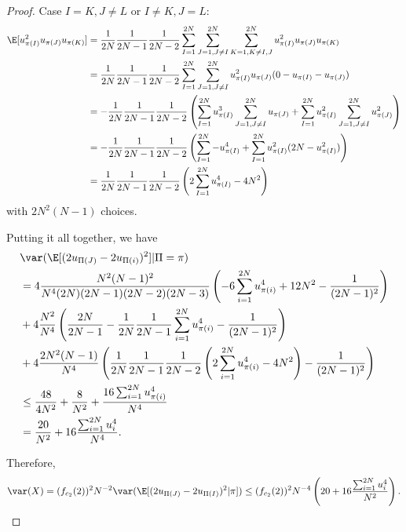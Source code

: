 \begin{proof}
  Case $I=K, J\neq L$ or $I\neq K, J= L$:
  \begin{align*}
    \E[u_{\pi(I)}^2 u_{\pi(J)} u_{\pi(K)}] &= \frac{1}{2N}\frac{1}{2N-1}\frac{1}{2N-2} \sum_{I=1}^{2N}
    \sum_{J=1, J\neq I}^{2N} \sum_{K=1, K \neq I,J}^{2N} u_{\pi(I)}^2 u_{\pi(J)} u_{\pi(K)} \\
    &=\frac{1}{2N}\frac{1}{2N-1}\frac{1}{2N-2} \sum_{I=1}^{2N}
    \sum_{J=1, J\neq I}^{2N} u_{\pi(I)}^2 u_{\pi(J)} (0 - u_{\pi(I)} - u_{\pi(J)}) \\ 
    &=-\frac{1}{2N}\frac{1}{2N-1}\frac{1}{2N-2} \left(
      \sum_{I=1}^{2N} u_{\pi(I)}^3 \sum_{J=1, J\neq I}^{2N} u_{\pi(J)} +
      \sum_{I=1}^{2N} u_{\pi(I)}^2 \sum_{J=1, J\neq I}^{2N} u_{\pi(J)}^2
    \right ) \\
    &=-\frac{1}{2N}\frac{1}{2N-1}\frac{1}{2N-2} \left(
      \sum_{I=1}^{2N} - u_{\pi(I)}^4 + 
      \sum_{I=1}^{2N} u_{\pi(I)}^2 (2N - u_{\pi(I)}^2)
    \right ) \\
    &=\frac{1}{2N}\frac{1}{2N-1}\frac{1}{2N-2} \left(
      2 \sum_{I=1}^{2N} u_{\pi(I)}^4 -4N^2 \right )
  \end{align*}
  with $2N^2(N-1)$ choices.  

  Putting it all together, we have 
  \begin{align*}
    &\var (\E[(2u_{\Pi(J)}-2u_{\Pi(i)})^2] | \Pi = \pi) \\
    &= 4 \frac{N^2(N-1)^2}{N^4(2N)(2N-1)(2N-2)(2N-3)} \left ( -6
      \sum_{i=1}^{2N}u_{\pi(i)}^4 + 12N^2 - \frac{1}{(2N-1)^2} \right ) \\
    &+ 4 \frac{N^2}{N^4} \left ( \frac{2N}{2N-1} -
    \frac{1}{2N}\frac{1}{2N-1}\sum_{i=1}^{2N}u_{\pi(i)}^4 - \frac{1}{(2N-1)^2}
  \right ) \\
  &+ 4 \frac{2N^2(N-1)}{N^4} \left ( 
    \frac{1}{2N}\frac{1}{2N-1}\frac{1}{2N-2}\left (
      2 \sum_{i=1}^{2N} u_{\pi(i)}^4 - 4N^2 \right ) - \frac{1}{(2N-1)^2}
  \right ) \\
  &\leq \frac{48}{4N^2} + \frac{8}{N^2} + \frac{16 \sum_{i=1}^{2N}
    u_{\pi(i)}^4}{N^4} \\
  &= \frac{20}{N^2} + 16\frac{\sum_{i=1}^{2N} u_{i}^4}{N^4}.
  \end{align*}
  
  Therefore, 
  \begin{equation*}
    \var(X) = (f_{c_2}(2))^2 N^{-2} \var(\E [(2u_{\Pi(J)}-2u_{\Pi(I)})^2 | \pi ])
    \leq (f_{c_2}(2))^2 N^{-4} \left (20 + 16\frac{\sum_{i=1}^{2N}
        u_{i}^4}{N^2} \right ).
  \end{equation*}
  

\end{proof}
